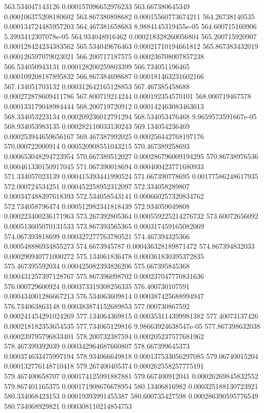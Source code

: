 {563.534047143126 0.000157096652976233
563.667380645349 0.000106375208180602
563.867380898682 0.00015560773674211
564.26738140535 0.000134724485957203
564.467381658683 8.9884145319455e-05
564.600715160906 5.3993412307078e-05
564.934048916462 0.000218328260056804
565.200715920907 0.000128424234383562
565.534049676463 0.00021710194661812
565.867383432019 0.000126597079023021
566.200717187575 0.000236708007857238
566.534050943131 0.000128200259803399
566.734051196465 0.000109208187895832
566.867384698687 0.000181463231602166
567.134051703132 0.000312642165128853
567.467385458688 0.000272878609411786
567.800719214244 0.000192354570101
568.000719467578 0.000133179048984444
568.200719720912 0.000142463083463613
568.334053223134 0.000209236012791294
568.534053476468 9.9659573591667e-05
568.934053983135 0.000282110033130243
569.134054236469 0.000253944659656167
569.467387992025 0.000256442768197176
570.000722000914 0.000520908551043215
570.467389258693 0.000653048294723954
570.667389512027 0.000286796009194295
570.86738976536 0.000461330150917045
571.067390018694 0.000400423771680933
571.334057023139 0.000415393441990524
571.667390778695 0.00177586248617935
572.000724534251 0.000452258952312097
572.334058289807 0.000347488397618393
572.534058543141 0.000660257320834762
572.734058796474 0.000512982341818439
572.934059049808 0.000223400236171963
573.267392805364 0.000559225214276732
573.60072656092 0.000513605070131533
573.867393565365 0.000317459165082069
574.067393818699 0.000327277763780521
574.467394325366 0.000548886934855273
574.6673945787 0.000436328189871472
574.867394832033 0.000290940771000272
575.134061836478 0.000361830395372835
575.467395592034 0.000425082393826206
575.667395845368 0.000431257397128767
575.867396098702 0.000237047770831636
576.000729600924 0.000373319308256335
576.400730107591 0.000434001286667213
576.534063609814 0.000387425688994947
576.734063863148 0.000383874152689853
577.000730867592 0.000241454291024269
577.134064369815 0.000353114399981382
577.40073137426 0.000218182353654535
577.734065129816 9.98663924638547e-05
577.867398632038 0.000239795796833401
578.200732387594 0.000205237577681962
578.467399392039 0.000342964687660807
578.667399645373 0.000374633475997194
578.934066649818 0.000137533056297085
579.06740015204 0.000132776148710418
579.267400405374 0.000262558257775191
579.467400658707 0.000174125991887881
579.667400912041 0.00026269845832552
579.867401165375 0.000171908676678954
580.13406816982 0.000325188130723921
580.334068423153 0.00019393991455387
580.600735427598 0.000286390595776549
580.734068929821 0.000308110214854753
}
